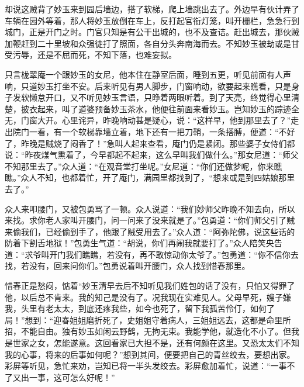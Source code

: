 \begin{parag}
    却说这贼背了妙玉来到园后墙边，搭了软梯，爬上墙跳出去了。外边早有伙计弄了车辆在园外等着，那人将妙玉放倒在车上，反打起官衔灯笼，叫开栅栏，急急行到城门，正是开门之时。门官只知是有公干出城的，也不及查诘。赶出城去，那伙贼加鞭赶到二十里坡和众强徒打了照面，各自分头奔南海而去。不知妙玉被劫或是甘受污辱，还是不屈而死，不知下落，也难妄拟。
\end{parag}


\begin{parag}
    只言栊翠庵一个跟妙玉的女尼，他本住在静室后面，睡到五更，听见前面有人声响，只道妙玉打坐不安。后来听见有男人脚步，门窗响动，欲要起来瞧看，只是身子发软懒怠开口，又不听见妙玉言语，只睁着两眼听着。到了天亮，终觉得心里清楚，披衣起来，叫了道婆预备妙玉茶水，他便往前面来看妙玉。岂知妙玉的踪迹全无，门窗大开。心里诧异，昨晚响动甚是疑心，说：“这样早，他到那里去了？”走出院门一看，有一个软梯靠墙立着，地下还有一把刀鞘，一条搭膊，便道：“不好了，昨晚是贼烧了闷香了！”急叫人起来查看，庵门仍是紧闭。那些婆子女侍们都说：“昨夜煤气熏着了，今早都起不起来，这么早叫我们做什么。”那女尼道：“师父不知那里去了。”众人道：“在观音堂打坐呢。”女尼道：“你们还做梦呢，你来瞧瞧。”众人不知，也都着忙，开了庵门，满园里都找到了，“想来或是到四姑娘那里去了。”
\end{parag}


\begin{parag}
    众人来叩腰门，又被包勇骂了一顿。众人说道：“我们妙师父昨晚不知去向，所以来找。求你老人家叫开腰门，问一问来了没来就是了。”包勇道：“你们师父引了贼来偷我们，已经偷到手了，他跟了贼受用去了。”众人道：“阿弥陀佛，说这些话的防着下割舌地狱！”包勇生气道：“胡说，你们再闹我就要打了。”众人陪笑央告道：“求爷叫开门我们瞧瞧，若没有，再不敢惊动你太爷了。”包勇道：“你不信你去找，若没有，回来问你们。”包勇说着叫开腰门，众人找到惜春那里。
\end{parag}


\begin{parag}
    惜春正是愁闷，惦着“妙玉清早去后不知听见我们姓包的话了没有，只怕又得罪了他，以后总不肯来。我的知己是没有了。况我现在实难见人。父母早死，嫂子嫌我，头里有老太太，到底还疼我些，如今也死了，留下我孤苦伶仃，如何了局！”想到：“迎春姐姐磨折死了，史姐姐守着病人，三姐姐远去，这都是命里所招，不能自由。独有妙玉如闲云野鹤，无拘无束。我能学他，就造化不小了。但我是世家之女，怎能遂意。这回看家已大担不是，还有何颜在这里。又恐太太们不知我的心事，将来的后事如何呢？”想到其间，便要把自己的青丝绞去，要想出家。彩屏等听见，急忙来劝，岂知已将一半头发绞去。彩屏愈加着忙，说道：“一事不了又出一事，这可怎么好呢！”
\end{parag}


